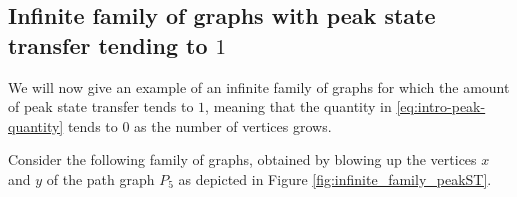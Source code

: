 \documentclass{article}
\numberwithin{equation}{section}
\begin{document}
\subsection{Infinite family of graphs with peak state transfer tending to 
\texorpdfstring{$1$}{1}}
\label{subsec:peakST_arc_reversal_approaches_1}

We will now give an example of an infinite family of graphs for which the amount of peak state transfer tends to $1$, meaning that the quantity in \eqref{eq:intro-peak-quantity} tends to $0$ as the number of vertices grows.

Consider the following family of graphs, obtained by blowing up the vertices $x$ and $y$ of the path graph $P_5$ as depicted in Figure \ref{fig:infinite_family_peakST}.
\begin{figure}
\centering
{}

\vspace{10pt}


\end{figure}
\end{document}
